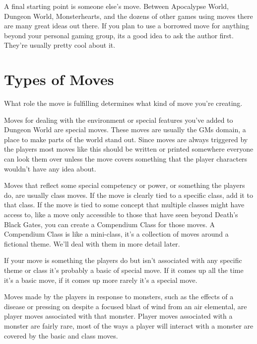 A final starting point is someone else's move. Between Apocalypse World, Dungeon World, Monsterhearts, and the dozens of other games using moves there are many great ideas out there. If you plan to use a borrowed move for anything beyond your personal gaming group, its a good idea to ask the author first. They're usually pretty cool about it.

 
\section{Types of Moves}    
 

What role the move is fulfilling determines what kind of move you're creating.

 

Moves for dealing with the environment or special features you've added to Dungeon World are special moves. These moves are usually the GMs domain, a place to make parts of the world stand out. Since moves are always triggered by the players most moves like this should be written or printed somewhere everyone can look them over unless the move covers something that the player characters wouldn't have any idea about.

 

Moves that reflect some special competency or power, or something the players do, are usually class moves. If the move is clearly tied to a specific class, add it to that class. If the move is tied to some concept that multiple classes might have access to, like a move only accessible to those that have seen beyond Death's Black Gates, you can create a Compendium Class for those moves. A Compendium Class is like a mini-class, it's a collection of moves around a fictional theme. We'll deal with them in more detail later.

 

If your move is something the players do but isn't associated with any specific theme or class it's probably a basic of special move. If it comes up all the time it's a basic move, if it comes up more rarely it's a special move.

 

Moves made by the players in response to monsters, such as the effects of a disease or pressing on despite a focused blast of wind from an air elemental, are player moves associated with that monster. Player moves associated with a monster are fairly rare, most of the ways a player will interact with a monster are covered by the basic and class moves.

